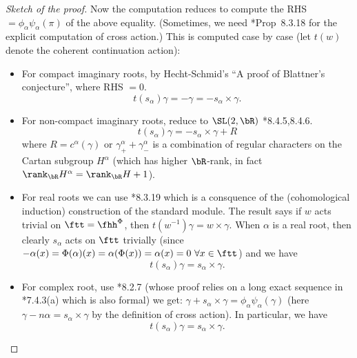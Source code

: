 \documentclass[12pt,a4paper]{amsart}
\numberwithin{equation}{section}
\theoremstyle{remark}
\newcommand{\cross}{\times}
\begin{document}
\begin{proof}[Sketch of the proof]
{    Now the computation reduces to compute the RHS
    $=\phi_{\alpha} \psi_{\alpha} (\pi)$ of the above equality. (Sometimes, we
    need \cite{Vg}*{Prop~8.3.18} for the explicit computation of cross action.)
    This is computed case by case (let $t(w)$ denote the coherent continuation
    action):
    \begin{itemize}
      \item For compact imaginary roots, by Hecht-Schmid's ``A proof of
      Blattner's conjecture'', where RHS $=0$.
      \[
        t(s_{\alpha}) \gamma = - \gamma = - s_{\alpha}\cross \gamma.
      \]
      \item For non-compact imaginary roots, reduce to $\SL(2,\bR)$
      \cite{Vg}*{8.4.5,8.4.6}.
      \[
        t(s_{\alpha}) \gamma = - s_{\alpha}\cross \gamma + R
      \]
      where $R = c^{\alpha}(\gamma)$ or
      $\gamma^{\alpha}_{+}+\gamma^{\alpha}_{-}$ is a combination of
      regular characters on the Cartan subgroup $H^{\alpha}$ (which has
      higher $\bR$-rank, in fact
      $\rank_{\bR}H^{\alpha} = \rank_{\bR} H +1$).
      \item For real roots we can use \cite{Vg}*{8.3.19} which is a consquence
      of the (cohomological induction) construction of the standard
      module. The result says if $w$ acts trivial on $\ftt=\fhh^{\Phi}$,
      then $t(w^{-1})\gamma = w\cross \gamma$. When $\alpha$ is a real
      root, then clearly $s_{\alpha}$ acts on $\ftt$ trivially (since
      $-\alpha(x) = \Phi(\alpha)(x) = \alpha(\Phi(x)) = \alpha(x) = 0
      \ \forall x\in \ftt$)
      and we have
      \[
        t(s_{\alpha}) \gamma = s_{\alpha}\cross \gamma.
      \]
      \item For complex root, use \cite{Vg}*{8.2.7} (whose proof relies on a
      long exact sequence in \cite{Vg}*{7.4.3(a)} which is also formal) we get:
      $\gamma + s_{\alpha}\cross \gamma = \phi_{\alpha} \psi_{\alpha} (\gamma)$
      (here $\gamma-n\alpha = s_{\alpha}\cross \gamma$ by the definition of
      cross action).
      In particular, we have
      \[
        t(s_{\alpha}) \gamma = s_{\alpha}\cross \gamma.
      \]
    \end{itemize}
 }


\end{proof}
\end{document}
